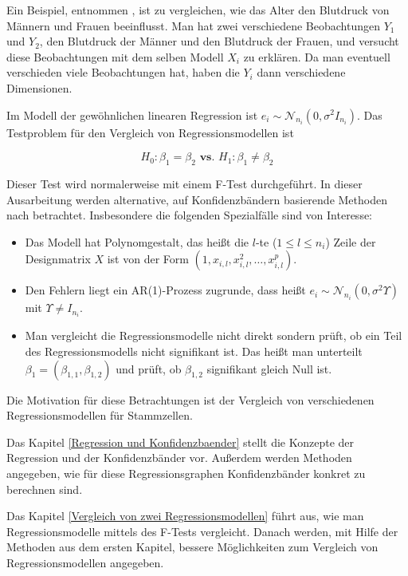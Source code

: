 \documentclass[12pt,a4paper]{article}
\theoremstyle{definition}
\theoremstyle{definition}
\theoremstyle{definition}
\theoremstyle{definition}
\begin{document}
Ein Beispiel, entnommen \cite[116]{Liu64}, ist zu vergleichen, wie das Alter den Blutdruck von Männern und Frauen beeinflusst. Man hat zwei verschiedene Beobachtungen $Y_1$ und $Y_2$, den Blutdruck der Männer und den Blutdruck der Frauen, und versucht diese Beobachtungen mit dem selben Modell $X_i$ zu erklären. Da man eventuell verschieden viele Beobachtungen hat, haben die $Y_i$ dann verschiedene Dimensionen.

Im Modell der gewöhnlichen linearen Regression ist $e_i \sim \mathscr{N}_{n_i}(0,\sigma^2 I_{n_i})$. Das Testproblem für den Vergleich von Regressionsmodellen ist

\begin{equation*}
H_{0} : \beta_{1} = \beta_{2}  \textbf{ vs. }  H_{1} : \beta_{1} \neq \beta_{2}
\end{equation*}


Dieser Test wird normalerweise mit einem F-Test durchgeführt. In dieser Ausarbeitung werden alternative, auf Konfidenzbändern basierende Methoden nach \cite{Liu64} betrachtet. Insbesondere die folgenden Spezialfälle sind von Interesse:

\begin{itemize}
\item Das Modell hat Polynomgestalt, das heißt die $l$-te ($1 \leq l \leq n_i $) Zeile der Designmatrix $X$ ist von der Form $(1, x_{i,l}, x_{i,l}^2, \ldots, x_{i,l}^p)$.
\item Den Fehlern liegt ein AR(1)-Prozess zugrunde, dass heißt $e_i \sim \mathscr{N}_{n_i}(0,\sigma^2 \Upsilon)$ mit $\Upsilon \neq I_{n_i}$.
\item Man vergleicht die Regressionsmodelle nicht direkt sondern prüft, ob ein Teil des Regressionsmodells nicht signifikant ist. Das heißt man unterteilt $\beta_1 = (\beta_{1,1}, \beta_{1,2})$ und prüft, ob $\beta_{1,2}$ signifikant gleich Null ist. 
\end{itemize} 

Die Motivation für diese Betrachtungen ist der Vergleich von verschiedenen Regressionsmodellen für Stammzellen.

Das Kapitel \ref{Regression und Konfidenzbaender} stellt die Konzepte der Regression und der Konfidenzbänder vor. Außerdem werden Methoden angegeben, wie für diese Regressionsgraphen Konfidenzbänder konkret zu berechnen sind. 

Das Kapitel \ref{Vergleich von zwei Regressionsmodellen} führt aus, wie man Regressionsmodelle mittels des F-Tests vergleicht. Danach werden, mit Hilfe der Methoden aus dem ersten Kapitel, bessere Möglichkeiten zum Vergleich von Regressionsmodellen angegeben.
\end{document}
